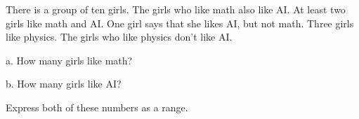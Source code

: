 There is a group of ten girls. The girls who like math also like AI. At least two girls like math and AI. One girl says that she likes AI, but not math. Three girls like physics. The girls who like physics don't like AI.

a. How many girls like math?

b. How many girls like AI?

Express both of these numbers as a range.
